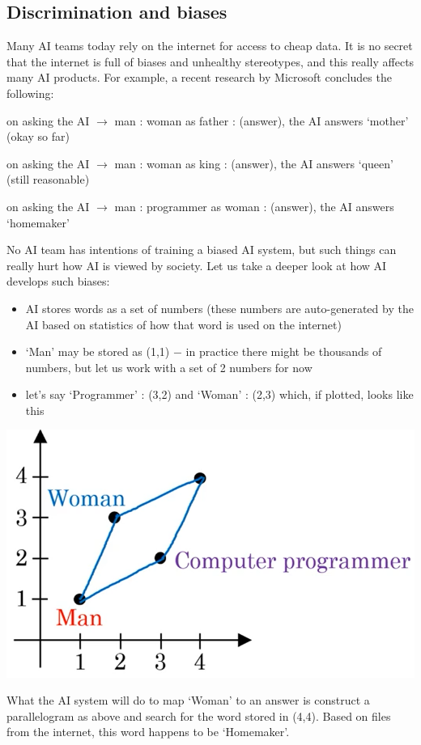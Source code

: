 \documentclass{article}[a4paper,12pt]
\theoremstyle{definition}
\begin{document}
\subsection{Discrimination and biases}
Many AI teams today rely on the internet for access to cheap data. It is no secret that the internet is full of biases and unhealthy stereotypes, and this really affects many AI products. For example, a recent research by Microsoft concludes the following:
\begin{center}
on asking the AI $\rightarrow$ man : woman as father : (answer), the AI answers `mother' (okay so far)

on asking the AI $\rightarrow$ man : woman as king : (answer), the AI answers `queen' (still reasonable)

on asking the AI $\rightarrow$ man : programmer as woman : (answer), the AI answers `homemaker'
\end{center}
No AI team has intentions of training a biased AI system, but such things can really hurt how AI is viewed by society. Let us take a deeper look at how AI develops such biases:
\begin{itemize}
	\item AI stores words as a set of numbers (these numbers are auto-generated by the AI based on statistics of how that word is used on the internet)
	\item `Man' may be stored as (1,1) $-$ in practice there might be thousands of numbers, but let us work with a set of 2 numbers for now
	\item let's say `Programmer' : (3,2) and `Woman' : (2,3) which, if plotted, looks like this
\end{itemize}
\begin{center}\includegraphics[scale=0.4]{word_plot.png}\end{center}
What the AI system will do to map `Woman' to an answer is construct a parallelogram as above and search for the word stored in (4,4). Based on files from the internet, this word happens to be `Homemaker'.
\vspace{6pt}
\end{document}

